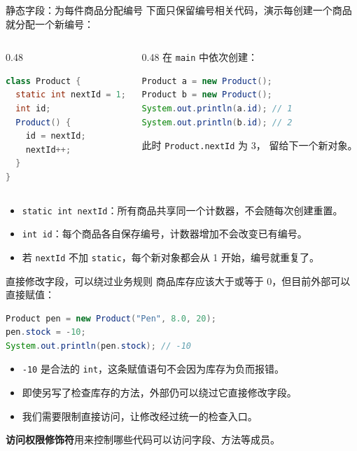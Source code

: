 \documentclass[aspectratio=169]{beamer}
\begin{document}
\begin{frame}[fragile]{静态字段：为每件商品分配编号}
  下面只保留编号相关代码，演示每创建一个商品就分配一个新编号：
  \begin{columns}[T,onlytextwidth]
    \begin{column}{0.48\textwidth}
      \begin{lstlisting}[language=Java]
class Product {
  static int nextId = 1;
  int id;
  Product() {
    id = nextId;
    nextId++;
  }
}
      \end{lstlisting}
    \end{column}
    \begin{column}{0.48\textwidth}
      在 \texttt{main} 中依次创建：
      \begin{lstlisting}[language=Java]
Product a = new Product();
Product b = new Product();
System.out.println(a.id); // 1
System.out.println(b.id); // 2
      \end{lstlisting}
      此时 \texttt{Product.nextId} 为 3，
      留给下一个新对象。
    \end{column}
  \end{columns}
  \begin{itemize}
    \item \texttt{static int nextId}：所有商品共享同一个计数器，不会随每次创建重置。
    \item \texttt{int id}：每个商品各自保存编号，计数器增加不会改变已有编号。
    \item 若 \texttt{nextId} 不加 \texttt{static}，每个新对象都会从 1 开始，编号就重复了。
  \end{itemize}
\end{frame}

\begin{frame}[fragile]{直接修改字段，可以绕过业务规则}
  商品库存应该大于或等于 0，但目前外部可以直接赋值：
  \begin{lstlisting}[language=Java]
Product pen = new Product("Pen", 8.0, 20);
pen.stock = -10;
System.out.println(pen.stock); // -10
  \end{lstlisting}
  \begin{itemize}
    \item \texttt{-10} 是合法的 \texttt{int}，这条赋值语句不会因为库存为负而报错。
    \item 即使另写了检查库存的方法，外部仍可以绕过它直接修改字段。
    \item 我们需要限制直接访问，让修改经过\alert{统一的检查入口}。
  \end{itemize}
  \medskip
  \textbf{访问权限修饰符}用来控制哪些代码可以访问字段、方法等成员。
\end{frame}
\end{document}
